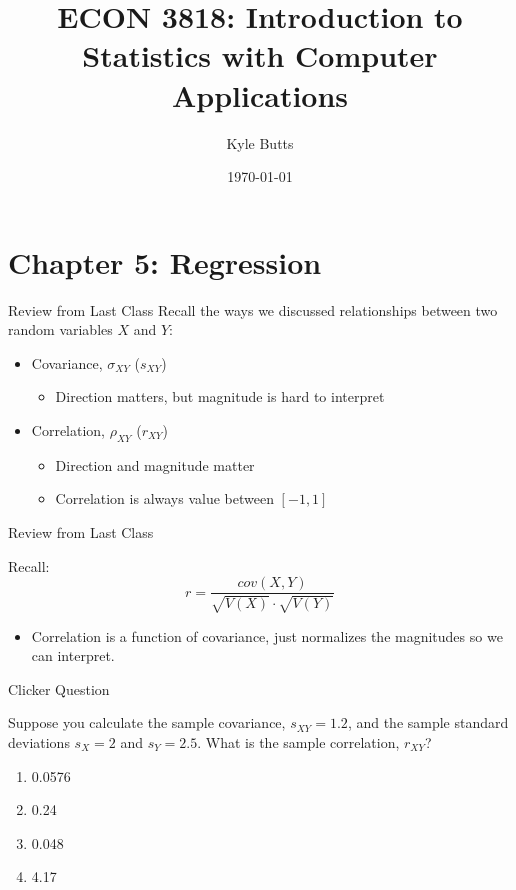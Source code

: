 \documentclass{beamer}
\title{ECON 3818: Introduction to Statistics with Computer Applications}
\date{\today}
\author{Kyle Butts}
\begin{document}
\maketitle




\section{Chapter 5: Regression}

\begin{frame}{Review from Last Class}	
	Recall the ways we discussed relationships between two random variables $X$ and $Y$:
	\begin{itemize}
		
		\item Covariance, $\sigma_{XY}$ ($s_{XY}$)
		      \begin{itemize}
		      	\item Direction matters, but magnitude is hard to interpret
		      \end{itemize}
		      
		\item Correlation, $\rho_{XY}$ ($r_{XY}$)
		      \begin{itemize}
		      	\item Direction and magnitude matter
		      	\item Correlation is always value between $[-1,1]$
		      \end{itemize}
	\end{itemize}
	
\end{frame}

\begin{frame}{Review from Last Class}
	
	Recall: 
	$$r=\frac{cov(X,Y)}{\sqrt{V(X)}\cdot \sqrt{V(Y)}}$$
	
	\begin{itemize}
		\item Correlation is a function of covariance, just normalizes the magnitudes so we can interpret.
	\end{itemize}
	
\end{frame}

\begin{frame}{Clicker Question}
	
	Suppose you calculate the sample covariance, $s_{XY}=1.2$, and the sample standard deviations $s_X=2$ and $s_Y=2.5$. What is the sample correlation, $r_{XY}$?
	
	\begin{enumerate}[label=(\alph*)]
		\item 0.0576
		\item 0.24 %
		\item 0.048
		\item 4.17
	\end{enumerate}
	
\end{frame}
\end{document}
